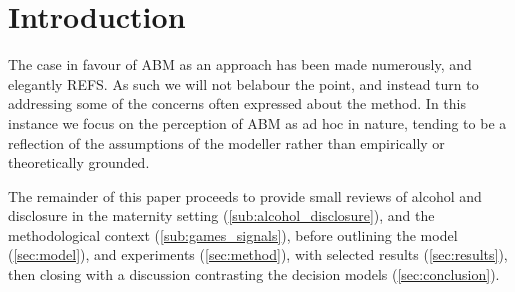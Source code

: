 \section{Introduction}
\label{sec:intro}

The case in favour of \ac{ABM} as an approach has been made numerously, and elegantly REFS. As such we will not belabour the point, and instead turn to addressing some of the concerns often expressed about the method. In this instance we focus on the perception of \ac{ABM} as ad hoc in nature, tending to be a reflection of the assumptions of the modeller rather than empirically or theoretically grounded.


The remainder of this paper proceeds to provide small reviews of alcohol and disclosure in the maternity setting (\ref{sub:alcohol_disclosure}), and the methodological context (\ref{sub:games_signals}), before outlining the model (\ref{sec:model}), and experiments (\ref{sec:method}), with selected results (\ref{sec:results}), then closing with a discussion contrasting the decision models (\ref{sec:conclusion}).